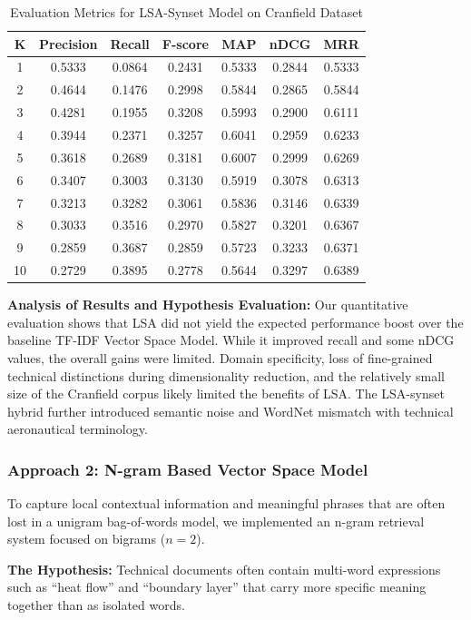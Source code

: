 \begin{table}[H]
\centering
\begin{tabular}{|c|c|c|c|c|c|c|}
\hline
K & Precision & Recall & F-score & MAP & nDCG & MRR \\ \hline
1  & 0.5333 & 0.0864 & 0.2431 & 0.5333 & 0.2844 & 0.5333 \\
2  & 0.4644 & 0.1476 & 0.2998 & 0.5844 & 0.2865 & 0.5844 \\
3  & 0.4281 & 0.1955 & 0.3208 & 0.5993 & 0.2900 & 0.6111 \\
4  & 0.3944 & 0.2371 & 0.3257 & 0.6041 & 0.2959 & 0.6233 \\
5  & 0.3618 & 0.2689 & 0.3181 & 0.6007 & 0.2999 & 0.6269 \\
6  & 0.3407 & 0.3003 & 0.3130 & 0.5919 & 0.3078 & 0.6313 \\
7  & 0.3213 & 0.3282 & 0.3061 & 0.5836 & 0.3146 & 0.6339 \\
8  & 0.3033 & 0.3516 & 0.2970 & 0.5827 & 0.3201 & 0.6367 \\
9  & 0.2859 & 0.3687 & 0.2859 & 0.5723 & 0.3233 & 0.6371 \\
10 & 0.2729 & 0.3895 & 0.2778 & 0.5644 & 0.3297 & 0.6389 \\ \hline
\end{tabular}
\caption{Evaluation Metrics for LSA-Synset Model on Cranfield Dataset}
\end{table}

\textbf{Analysis of Results and Hypothesis Evaluation:}
Our quantitative evaluation shows that LSA did not yield the expected performance boost over the baseline TF-IDF Vector Space Model. While it improved recall and some nDCG values, the overall gains were limited. Domain specificity, loss of fine-grained technical distinctions during dimensionality reduction, and the relatively small size of the Cranfield corpus likely limited the benefits of LSA. The LSA-synset hybrid further introduced semantic noise and WordNet mismatch with technical aeronautical terminology.

\subsubsection{Approach 2: N-gram Based Vector Space Model}
To capture local contextual information and meaningful phrases that are often lost in a unigram bag-of-words model, we implemented an n-gram retrieval system focused on bigrams ($n=2$).

\textbf{The Hypothesis:} Technical documents often contain multi-word expressions such as ``heat flow'' and ``boundary layer'' that carry more specific meaning together than as isolated words.


